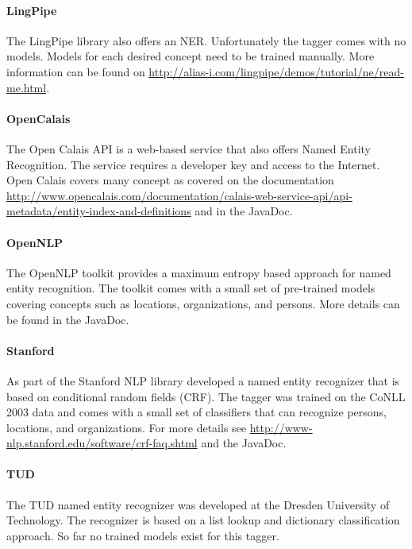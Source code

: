 \documentclass[a4paper,twoside]{book}      %
\begin{document}
\paragraph{LingPipe} The LingPipe library \cite{lingpipe} also offers an NER. Unfortunately the tagger comes with no models. Models for each desired concept need to be trained manually. More information can be found on \url{http://alias-i.com/lingpipe/demos/tutorial/ne/read-me.html}.

\paragraph{OpenCalais} The Open Calais API \cite{opencalais} is a web-based service that also offers Named Entity Recognition. The service requires a developer key and access to the Internet. Open Calais covers many concept as covered on the documentation \url{http://www.opencalais.com/documentation/calais-web-service-api/api-metadata/entity-index-and-definitions} and in the JavaDoc.

\paragraph{OpenNLP} The OpenNLP toolkit \cite{opennlp} provides a maximum entropy based approach for named entity recognition. The toolkit comes with a small set of pre-trained models covering concepts such as locations, organizations, and persons. More details can be found in the JavaDoc.

\paragraph{Stanford} As part of the Stanford NLP library \cite{stanfordnlp} \cite{finkel2005stanfordner} developed a named entity recognizer that is based on conditional random fields (CRF). The tagger was trained on the CoNLL 2003 data and comes with a small set of classifiers that can recognize persons, locations, and organizations. For more details see \url{http://www-nlp.stanford.edu/software/crf-faq.shtml} and the JavaDoc.

\paragraph{TUD} The TUD named entity recognizer was developed at the Dresden University of Technology. The recognizer is based on a list lookup and dictionary classification approach. So far no trained models exist for this tagger.
\end{document}
